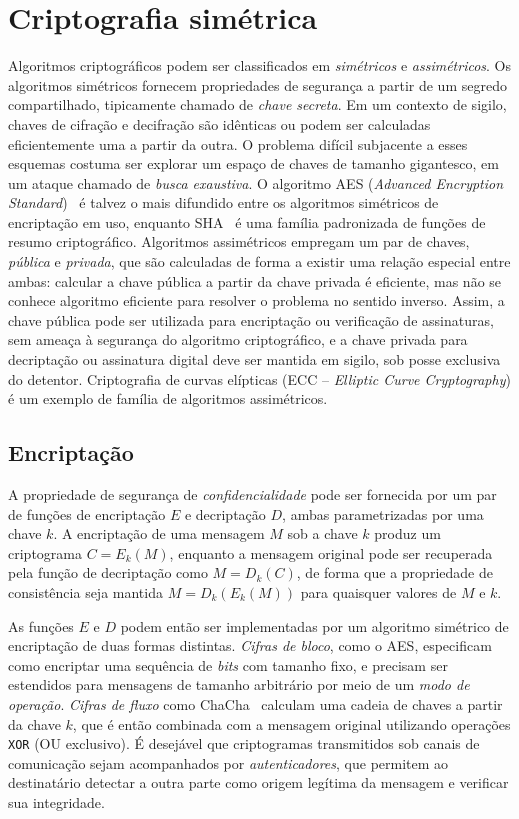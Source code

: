 \section{Criptografia simétrica}

Algoritmos criptográficos podem ser classificados em \emph{simétricos} e \emph{assimétricos}. Os algoritmos simétricos fornecem propriedades de segurança a partir de um segredo compartilhado, tipicamente chamado de \emph{chave secreta}. Em um contexto de sigilo, chaves de cifração e decifração são idênticas ou podem ser calculadas eficientemente uma a partir da outra. O problema difícil subjacente a esses esquemas costuma ser explorar um espaço de chaves de tamanho gigantesco, em um ataque chamado de \emph{busca exaustiva}. O algoritmo AES (\emph{Advanced Encryption Standard})~\cite{AES} é talvez o mais difundido entre os algoritmos simétricos de encriptação em uso, enquanto SHA~\cite{SHA2} é uma família padronizada de funções de resumo criptográfico. Algoritmos assimétricos empregam um par de chaves, \emph{pública} e \emph{privada}, que são calculadas de forma a existir uma relação especial entre ambas: calcular a chave pública a partir da chave privada é eficiente, mas não se conhece algoritmo eficiente para resolver o problema no sentido inverso. Assim, a chave pública pode ser utilizada para encriptação ou verificação de assinaturas, sem ameaça à segurança do algoritmo criptográfico, e a chave privada para decriptação ou assinatura digital deve ser mantida em sigilo, sob posse exclusiva do detentor. Criptografia de curvas elípticas (ECC -- \emph{Elliptic Curve Cryptography}) é um exemplo de família de algoritmos assimétricos.

\subsection{Encriptação}

A propriedade de segurança de \emph{confidencialidade} pode ser fornecida por um par de funções de encriptação $E$ e decriptação $D$, ambas parametrizadas por uma chave $k$. A encriptação de uma mensagem $M$ sob a chave $k$ produz um criptograma $C = E_k(M)$, enquanto a mensagem original pode ser recuperada pela função de decriptação como $M = D_k(C)$, de forma que a propriedade de consistência seja mantida $M = D_k(E_k(M))$ para quaisquer valores de $M$ e $k$.

As funções $E$ e $D$ podem então ser implementadas por um algoritmo simétrico de encriptação de duas formas distintas. \emph{Cifras de bloco}, como o AES, especificam como encriptar uma sequência de \emph{bits} com tamanho fixo, e precisam ser estendidos para mensagens de tamanho arbitrário por meio de um \emph{modo de operação}. \emph{Cifras de fluxo} como ChaCha~\cite{Chachaspec} calculam uma cadeia de chaves a partir da chave $k$, que é então combinada com a mensagem original utilizando operações \texttt{XOR} (OU exclusivo). É desejável que criptogramas transmitidos sob canais de comunicação sejam acompanhados por \emph{autenticadores}, que permitem ao destinatário detectar a outra parte como origem legítima da mensagem e verificar sua integridade.

